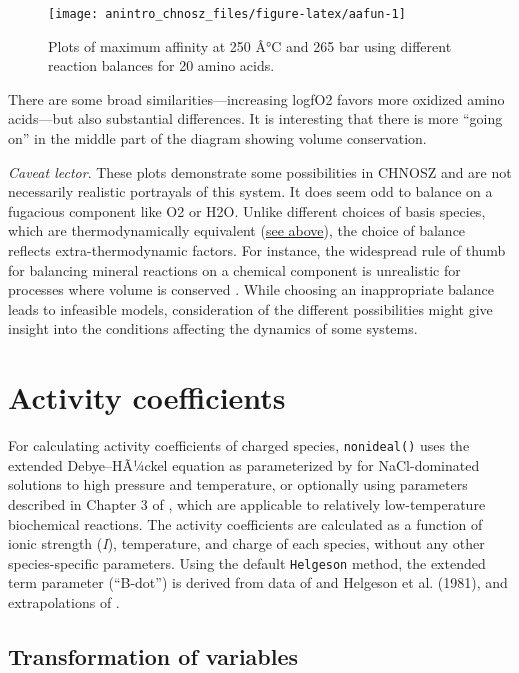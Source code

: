 \documentclass[]{tufte-handout}
\begin{document}
\begin{figure}
\texttt{[image: anintro\_chnosz\_files/figure-latex/aafun-1]} \caption[Plots of maximum affinity at 250 Â°C and 265 bar using different reaction balances for 20 amino acids]{Plots of maximum affinity at 250 Â°C and 265 bar using different reaction balances for 20 amino acids.}\label{fig:aafun}
\end{figure}

There are some broad similarities---increasing logfO2 favors more
oxidized amino acids---but also substantial differences. It is
interesting that there is more ``going on'' in the middle part of the
diagram showing volume conservation.

\emph{Caveat lector}. These plots demonstrate some possibilities in
CHNOSZ and are not necessarily realistic portrayals of this system. It
does seem odd to balance on a fugacious component like O2 or H2O. Unlike
different choices of basis species, which are thermodynamically
equivalent (\protect\hyperlink{mosaicfun}{see above}), the choice of
balance reflects extra-thermodynamic factors. For instance, the
widespread rule of thumb for balancing mineral reactions on a chemical
component is unrealistic for processes where volume is conserved
\citep{MD98}. While choosing an inappropriate balance leads to
infeasible models, consideration of the different possibilities might
give insight into the conditions affecting the dynamics of some systems.

\section{Activity coefficients}\label{activity-coefficients}

For calculating activity coefficients of charged species,
{\texttt{nonideal()}} uses the extended Debye--HÃ¼ckel equation as
parameterized by \citet{HKF81} for NaCl-dominated solutions to high
pressure and temperature, or optionally using parameters described in
Chapter 3 of \citet{Alb03}, which are applicable to relatively
low-temperature biochemical reactions. The activity coefficients are
calculated as a function of ionic strength (\emph{I}), temperature, and
charge of each species, without any other species-specific parameters.
Using the default \texttt{Helgeson} method, the extended term parameter
(``B-dot'') is derived from data of \citet{Hel69} and Helgeson et al.
(1981), and extrapolations of \citet{MSS13}.

\subsection{Transformation of
variables}\label{transformation-of-variables}
\end{document}
